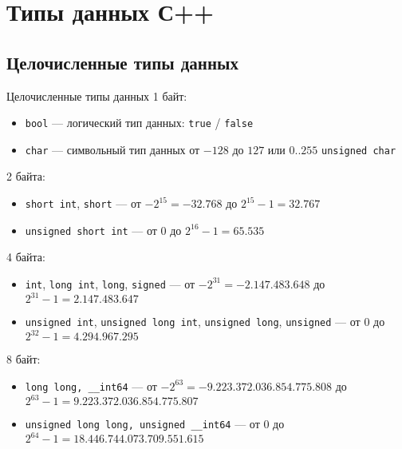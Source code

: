 \section{Типы данных С++}
\subsection{Целочисленные типы данных}

\begin{frame}[t]{Целочисленные типы данных}
  1 байт:
  \begin{itemize}
    \item \texttt{bool} --- логический тип данных: \texttt{true} / \texttt{false}
    \item \texttt{char} --- символьный тип данных от $-128$ до $127$ или $0..255$ \texttt{unsigned char}
  \end{itemize}
  2 байта:
  \begin{itemize}
    \item \texttt{short int}, \texttt{short} --- от $-2^{15}=-32.768$ до $2^{15}-1=32.767$
    \item \texttt{unsigned short int} --- от $0$ до $2^{16}-1=65.535$
  \end{itemize}
  4 байта:
  \begin{itemize}
    \item \texttt{int}, \texttt{long int}, \texttt{long}, \texttt{signed} --- от $-2^{31}=-2.147.483.648$ до $2^{31}-1=2.147.483.647$
    \item \texttt{unsigned int}, \texttt{unsigned long int}, \texttt{unsigned long}, \texttt{unsigned} --- от $0$ до $2^{32}-1=4.294.967.295$
  \end{itemize}
  8 байт:
  \begin{itemize}
    \item \texttt{long long, \_\_int64} --- от $-2^{63}=-9.223.372.036.854.775.808$ до $2^{63}-1=9.223.372.036.854.775.807$
    \item \texttt{unsigned long long, unsigned \_\_int64} --- от $0$ до $2^{64}-1=18.446.744.073.709.551.615$
  \end{itemize}
\end{frame}

